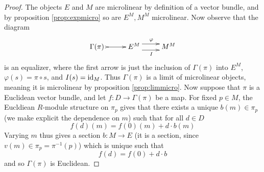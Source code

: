 \begin{proof}
  The objects \( E \) and \( M \) are microlinear by definition of a vector bundle, and by proposition \ref{prop:expmicro} so are \( E^M, M^M \) microlinear. Now observe that the diagram
  \begin{equation*}
    \xymatrix{
      {\Gamma(\pi)\,\,} \ar@{>->}[r] & E^M \ar@<1ex>[r]^{\varphi} \ar@<-1ex>[r]_{I} & M^M 
    }
  \end{equation*}
  is an equalizer, where the first arrow is just the inclusion of \( \Gamma(\pi) \) into \( E^M \), \( \varphi(s) = \pi\circ s \), and \( I(s) = \operatorname{id}_M \). Thus \( \Gamma(\pi) \) is a limit of microlinear objects, meaning it is microlinear by proposition \ref{prop:limmicro}. Now suppose that \( \pi \) is a Euclidean vector bundle, and let \( f:D\to \Gamma(\pi) \) be a map. For fixed \( p\in M \), the Eucldiean \( R \)-module structure on \( \pi_p \) gives that there exists a unique \( b(m)\in \pi_p \) (we make explicit the dependence on \( m \)) such that for all \( d\in D \)
  \begin{equation*}
    f(d)(m) = f(0)(m) + d\cdot b(m)
  \end{equation*}
  Varying \( m \) thus gives a section \( b:M\to E \) (it is a section, since \( v(m)\in \pi_p = \pi^{-1}(p) \)) which is unique such that
  \begin{equation*}
    f(d) = f(0) + d\cdot b
  \end{equation*}
  and so \( \Gamma(\pi) \) is Euclidean.
\end{proof}














